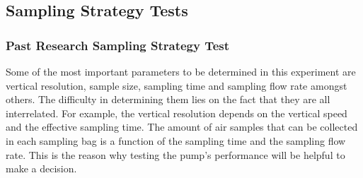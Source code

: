 \documentclass[a4paper,12pt,twoside]{article}
\begin{document}
\begin{appendices}
\begin{table}[H]

\noindent{}

\caption{Pump Flowrate/Efficiency According to the Datasheet and Tests.}
\label{tab:pump-flowrate-efficiency}
\end{table}

\subsection{Sampling Strategy Tests}

\subsubsection{Past Research Sampling Strategy Test}
Some of the most important parameters to be determined in this experiment are vertical resolution, sample size, sampling time and sampling flow rate amongst others. The difficulty in determining them lies on the fact that they are all interrelated. For example, the vertical resolution depends on the vertical speed and the effective sampling time. The amount of air samples that can be collected in each sampling bag is a function of the sampling time and the sampling flow rate. This is the reason why testing the pump's performance will be helpful to make a decision.


\end{appendices}
\end{document}
